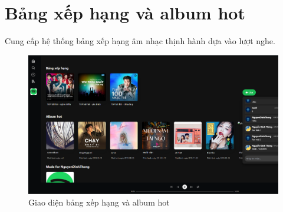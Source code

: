 \section{Bảng xếp hạng và album hot}
Cung cấp hệ thống bảng xếp hạng âm nhạc thịnh hành dựa vào lượt nghe.

\begin{figure}[H]
    \centering
    \includegraphics[width=1\textwidth]{imgs/chap5/bang_xep_hang_albumhot.png}
    \caption{Giao diện bảng xếp hạng và album hot}
\end{figure}